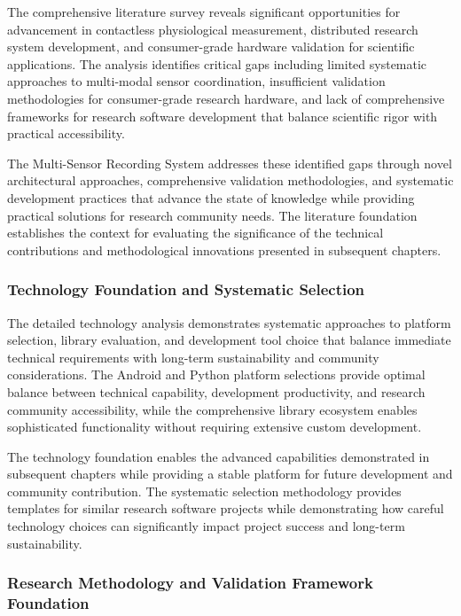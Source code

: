 \documentclass[11pt,a4paper]{report}
\begin{document}
The comprehensive literature survey reveals significant opportunities for advancement in contactless physiological
measurement, distributed research system development, and consumer-grade hardware validation for scientific
applications. The analysis identifies critical gaps including limited systematic approaches to multi-modal sensor
coordination, insufficient validation methodologies for consumer-grade research hardware, and lack of comprehensive
frameworks for research software development that balance scientific rigor with practical accessibility.

The Multi-Sensor Recording System addresses these identified gaps through novel architectural approaches, comprehensive
validation methodologies, and systematic development practices that advance the state of knowledge while providing
practical solutions for research community needs. The literature foundation establishes the context for evaluating the
significance of the technical contributions and methodological innovations presented in subsequent chapters.

\subsubsection{Technology Foundation and Systematic Selection}

The detailed technology analysis demonstrates systematic approaches to platform selection, library evaluation, and
development tool choice that balance immediate technical requirements with long-term sustainability and community
considerations. The Android and Python platform selections provide optimal balance between technical capability,
development productivity, and research community accessibility, while the comprehensive library ecosystem enables
sophisticated functionality without requiring extensive custom development.

The technology foundation enables the advanced capabilities demonstrated in subsequent chapters while providing a stable
platform for future development and community contribution. The systematic selection methodology provides templates for
similar research software projects while demonstrating how careful technology choices can significantly impact project
success and long-term sustainability.

\subsubsection{Research Methodology and Validation Framework Foundation}
\end{document}
